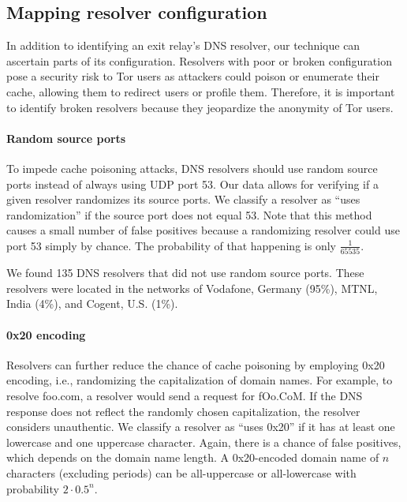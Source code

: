 \iffalse
\subsection{Mapping resolver configuration}
\label{sec:mapping-configuration}
In addition to identifying an exit relay's DNS resolver, our technique can
ascertain parts of its configuration.  Resolvers with poor or broken
configuration pose a security risk to Tor users as attackers could poison or
enumerate their cache, allowing them to redirect users or profile them.
Therefore, it is important to identify broken resolvers because they jeopardize
the anonymity of Tor users.

\paragraph{Random source ports}
To impede cache poisoning attacks, DNS resolvers should use random source ports
instead of always using UDP port 53.  Our data allows for verifying if a given
resolver randomizes its source ports.  We classify a resolver as ``uses
randomization'' if the source port does not equal 53.  Note that this method
causes a small number of false positives because a randomizing resolver could
use port 53 simply by chance.  The probability of that happening is
only $\frac{1}{65535}$.

We found 135 DNS resolvers that did not use random source ports.  These
resolvers were located in the networks of Vodafone, Germany (95\%), MTNL, India
(4\%), and Cogent, U.S. (1\%).

\paragraph{0x20 encoding}
Resolvers can further reduce the chance of cache poisoning by employing 0x20
encoding, i.e., randomizing the capitalization of domain names.  For example,
to resolve foo.com, a resolver would send a request for fOo.CoM.  If the DNS
response does not reflect the randomly chosen capitalization, the resolver
considers unauthentic.  We classify a resolver as ``uses 0x20'' if it has at
least one lowercase and one uppercase character.  Again, there is a chance of
false positives, which depends on the domain name length.  A 0x20-encoded
domain name of $n$ characters (excluding periods) can be all-uppercase or
all-lowercase with probability $2 \cdot 0.5^n$.

